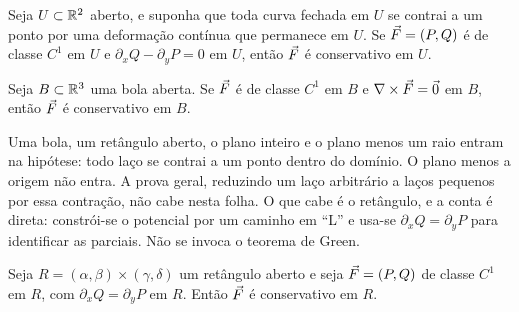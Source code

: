 \documentclass[11pt,a4paper]{article}
\begin{document}
\begin{teorema}
\label{thm:teste}
Seja $U\subset\mathbb{R}^2$ aberto, e suponha que toda curva fechada em $U$ se contrai a um ponto por uma deformação contínua que permanece em $U$. Se $\vec{F}=(P,Q)$ é de classe $C^1$ em $U$ e $\partial_x Q-\partial_y P=0$ em $U$, então $\vec{F}$ é conservativo em $U$.

Seja $B\subset\mathbb{R}^3$ uma bola aberta. Se $\vec{F}$ é de classe $C^1$ em $B$ e $\nabla\times\vec{F}=\vec{0}$ em $B$, então $\vec{F}$ é conservativo em $B$.
\end{teorema}

Uma bola, um retângulo aberto, o plano inteiro e o plano menos um raio entram na hipótese: todo laço se contrai a um ponto dentro do domínio. O plano menos a origem não entra. A prova geral, reduzindo um laço arbitrário a laços pequenos por essa contração, não cabe nesta folha. O que cabe é o retângulo, e a conta é direta: constrói-se o potencial por um caminho em ``L'' e usa-se $\partial_x Q=\partial_y P$ para identificar as parciais. Não se invoca o teorema de Green.

\begin{teorema}
\label{thm:retangulo}
Seja $R=(\alpha,\beta)\times(\gamma,\delta)$ um retângulo aberto e seja $\vec{F}=(P,Q)$ de classe $C^1$ em $R$, com $\partial_x Q=\partial_y P$ em $R$. Então $\vec{F}$ é conservativo em $R$.
\end{teorema}
\end{document}

